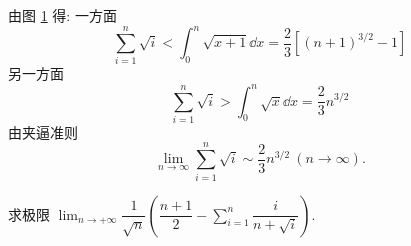 \begin{solution}
\begin{minipage}{0.28\linewidth}
\begin{figure}[H]
\begin{tikzpicture}[samples=100,>=stealth,font=\footnotesize,scale=0.6]
            \end{tikzpicture}
            \caption{}
            \label{yx1yx}
        \end{figure}
    \end{minipage}
    \hfill
    \begin{minipage}{0.68\linewidth}
        由图 \ref{yx1yx} 得: 一方面 $$\displaystyle\sum_{i=1}^{n}\sqrt{i}<\int_{0}^{n}\sqrt{x+1}\dd x=\frac{2}{3}\left[(n+1)^{3/2}-1\right]$$
        另一方面 $$\displaystyle\sum_{i=1}^{n}\sqrt{i}>\int_{0}^{n}\sqrt{x}\dd x=\frac{2}{3}n^{3/2}$$
        由夹逼准则 $$\displaystyle\lim_{n\to\infty}\sum_{i=1}^{n}\sqrt{i}\sim\frac{2}{3}n^{3/2}~ (n\to\infty).$$
    \end{minipage}
\end{solution}

\begin{example}
    求极限 $\displaystyle\lim_{n\to+\infty}\dfrac{1}{\sqrt{n}}\left(\dfrac{n+1}{2}-\sum_{i=1}^{n}\dfrac{i}{n+\sqrt{i}}\right).$
\end{example}

